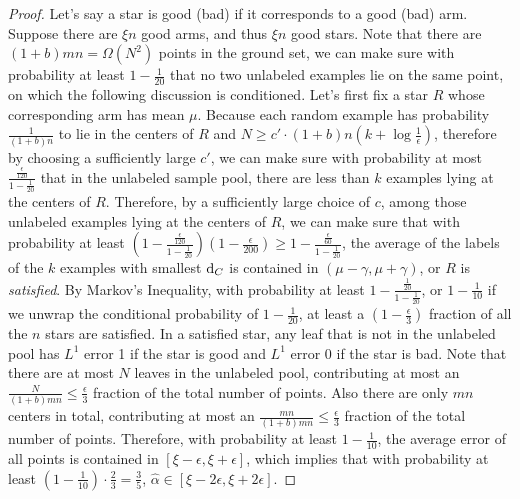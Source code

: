 \begin{proof}
Let's say a star is good (bad) if it corresponds to a good (bad) arm. Suppose there are $\xi n$ good arms, and thus $\xi n$ good stars. Note that there are $(1+b)mn=\Omega(N^2)$ points in the ground set, we can make sure with probability at least $1-\frac{1}{20}$ that no two unlabeled examples lie on the same point, on which the following discussion is conditioned. Let's first fix a star $R$ whose corresponding arm has mean $\mu$. Because each random example has probability $\frac{1}{(1+b)n}$ to lie in the centers of $R$ and $N\geq c'\cdot (1+b)n(k+\log\frac{1}{\epsilon})$, therefore by choosing a sufficiently large $c'$, we can make sure with probability at most $\frac{\frac{\epsilon}{120}}{1-\frac{1}{20}}$ that in the unlabeled sample pool, there are less than $k$ examples lying at the centers of $R$. Therefore, by a sufficiently large choice of $c$, among those unlabeled examples lying at the centers of $R$, we can make sure that with probability at least $(1-\frac{\frac{\epsilon}{120}}{1-\frac{1}{20}})(1-\frac{\epsilon}{200})\geq 1-\frac{\frac{\epsilon}{60}}{1-\frac{1}{20}}$, the average of the labels of the $k$ examples with smallest ${\mathrm{d}}_C$ is contained in $(\mu-\gamma,\mu+\gamma)$, or $R$ is \emph{satisfied}. By Markov's Inequality, with probability at least $1-\frac{\frac{1}{20}}{1-\frac{1}{20}}$, or $1-\frac{1}{10}$ if we unwrap the conditional probability of $1-\frac{1}{20}$, at least a $(1-\frac{\epsilon}{3})$ fraction of all the $n$ stars are satisfied. In a satisfied star, any leaf that is not in the unlabeled pool has $L^1$ error 1 if the star is good and $L^1$ error 0 if the star is bad. Note that there are at most $N$ leaves in the unlabeled pool, contributing at most an $\frac{N}{(1+b)mn}\leq\frac{\epsilon}{3}$ fraction of the total number of points. Also there are only $mn$ centers in total, contributing at most an $\frac{mn}{(1+b)mn}\leq\frac{\epsilon}{3}$ fraction of the total number of points. Therefore, with probability at least $1-\frac{1}{10}$, the average error of all points is contained in $[\xi-\epsilon,\xi+\epsilon]$, which implies that with probability at least $(1-\frac{1}{10})\cdot\frac{2}{3}=\frac{3}{5}$, $\hat\alpha\in[\xi-2\epsilon,\xi+2\epsilon]$.
 \end{proof}




